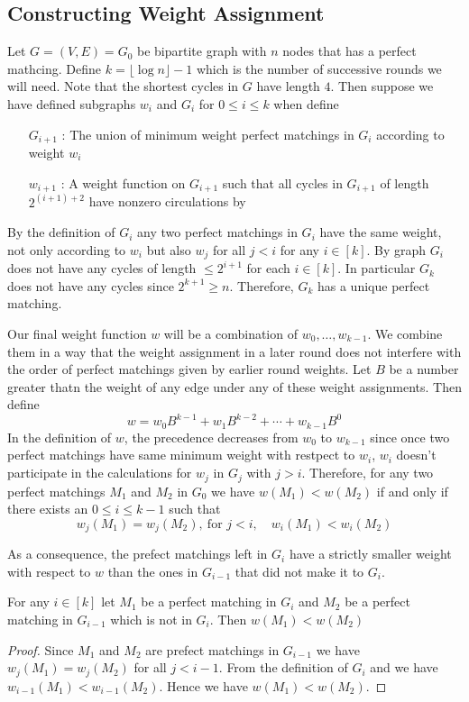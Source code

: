 \subsection{Constructing Weight Assignment}\label{constructing-weight-assignment}
Let $G=(V,E)=G_0$ be bipartite graph with $n$ nodes that has a perfect mathcing. Define $k=\lfloor \log n\rfloor -1$ which is the number of successive rounds we will need. Note that the shortest cycles in $G$ have length $4$. Then suppose we have defined subgraphs $w_i$ and $G_i$ for $0\leq i\leq k$ when define \begin{itemize}
	\item [$G_{i+1}$ :] The union of minimum weight perfect matchings in $G_i$ according to weight $w_i$
	\item [$w_{i+1}$ :] A weight function on $G_{i+1}$ such that all cycles in $G_{i+1}$ of length $2^{(i+1)+2}$ have nonzero circulations by 
\end{itemize}
By the definition of $G_i$ any two perfect matchings in $G_i$ have the same weight, not only according to $w_i$ but also $w_j$ for all $j<i$ for any $i\in[k]$. By  graph $G_i$ does not have any cycles of length $\leq 2^{i+1}$ for each $i\in[k]$. In particular $G_k$ does not have any cycles since $2^{k+1}\geq n$. Therefore, $G_k$ has a unique perfect matching.

Our  final weight function $w$ will be a combination of $w_0,\dots, w_{k-1}$. We combine them in a way that the weight assignment in a later round does not interfere with the order of perfect matchings given by earlier round weights. Let $B$ be a number greater thatn the weight of any edge under any of these weight assignments. Then define $$w=w_0B^{k-1}+w_1B^{k-2}+\cdots + w_{k-1}B^0$$In the definition of $w$, the precedence decreases from $w_0$ to $w_{k-1}$ since once two perfect matchings have same minimum weight with restpect to $w_i$, $w_i$ doesn't participate in the calculations for $w_{j}$ in $G_{j}$ with $j>i$. Therefore, for any two perfect matchings $M_1$ and $M_2$ in $G_0$ we have $w(M_1)<w(M_2)$ if and only if there exists an $0\leq i\leq k-1$ such that $$w_j(M_1)=w_j(M_2),\ \text{for $j<i$},\quad w_i(M_1)<w_i(M_2)$$

As a consequence, the prefect matchings left in $G_i$ have a strictly smaller weight with respect to $w$ than the ones in $G_{i-1}$ that did not make it to $G_i$.
\begin{lemma}{\cite[Lemma 3.5]{FennerGurjarThierauf_2016_Bpm_CONF}}{}
	For any $i\in[k]$ let $M_1$ be a perfect matching in $G_i$ and $M_2$ be a perfect matching in $G_{i-1}$ which is not in $G_i$. Then $w(M_1)<w(M_2)$
\end{lemma}
\begin{proof}
	Since $M_1$ and $M_2$ are prefect matchings in $G_{i-1}$ we have $w_{j}(M_1)=w_{j}(M_2)$ for all $j<i-1$. From the definition of $G_i$ and  we have $w_{i-1}(M_1)<w_{i-1}(M_2)$. Hence we have $w(M_1)<w(M_2)$.
\end{proof}


